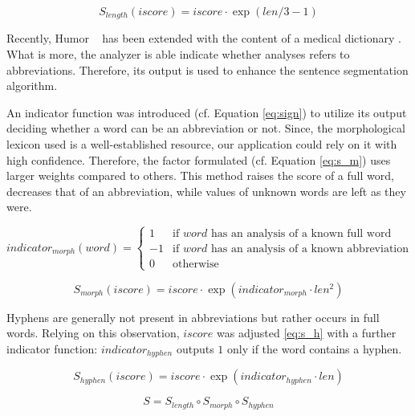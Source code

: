 \begin{equation} \label{eq:s_l}
S_{length}(iscore)= iscore \cdot \exp{(len/3-1)}
\end{equation}

Recently, Humor ~\cite{Proszeky1994,Novak2003,Proszeky2005}  has been extended with the content of a medical dictionary \cite{Orosz2013}. 
What is more, the analyzer is able indicate whether analyses refers to abbreviations.
Therefore, its output is used to enhance the sentence segmentation algorithm.  

An indicator function was introduced (cf. Equation \ref{eq:sign}) to utilize its output deciding whether a word can be an abbreviation or not.
Since, the morphological lexicon used is a well-established resource, our application could rely on it with high confidence.
Therefore, the factor formulated (cf. Equation \ref{eq:s_m}) uses larger weights compared to others. 
This method raises the score of a full word, decreases that of an abbreviation, while values of unknown words are left as they were.

\begin{equation}\label{eq:sign}
 indicator_{morph}(word) =
  \begin{cases}
   1  & \text{if $word$ has an analysis of a known full word} \\
   -1 & \text{if $word$ has an analysis of a known abbreviation} \\
   0  & \text{otherwise}
  \end{cases}
\end{equation}

\begin{equation} \label{eq:s_m}
S_{morph}(iscore)= iscore \cdot \exp{( indicator_{morph} \cdot len^2)}
\end{equation}

Hyphens are generally not present in abbreviations but rather occurs in full words. 
Relying on this observation, $iscore$ was adjusted \eqref{eq:s_h} with a further indicator function:
$indicator_{hyphen}$ outputs $1$ only if the word contains a hyphen. 

\begin{equation} \label{eq:s_h}
S_{hyphen}(iscore)= iscore \cdot \exp{(indicator_{hyphen} \cdot len)}
\end{equation}

\begin{equation} \label{eq:scaling}
S = S_{length} \circ S_{morph} \circ S_{hyphen}
\end{equation}

